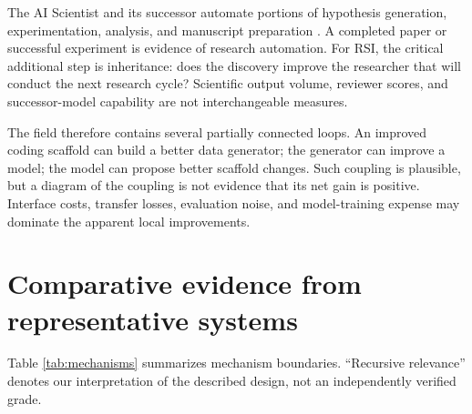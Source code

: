 \documentclass[11pt,american,]{article}
\begin{document}
The AI Scientist and its successor automate portions of hypothesis
generation, experimentation, analysis, and manuscript preparation
\citep{scientist2024, scientistv22025}. A completed paper or successful
experiment is evidence of research automation. For RSI, the critical
additional step is inheritance: does the discovery improve the
researcher that will conduct the next research cycle? Scientific output
volume, reviewer scores, and successor-model capability are not
interchangeable measures.

The field therefore contains several partially connected loops. An
improved coding scaffold can build a better data generator; the
generator can improve a model; the model can propose better scaffold
changes. Such coupling is plausible, but a diagram of the coupling is
not evidence that its net gain is positive. Interface costs, transfer
losses, evaluation noise, and model-training expense may dominate the
apparent local improvements.

\hypertarget{comparative-evidence-from-representative-systems}{%
\section{Comparative evidence from representative
systems}\label{comparative-evidence-from-representative-systems}}

Table \ref{tab:mechanisms} summarizes mechanism boundaries. ``Recursive
relevance'' denotes our interpretation of the described design, not an
independently verified grade.
\end{document}
